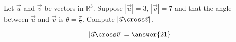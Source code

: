\documentclass{ximera}
\author{Gregory Hartman \and Matthew Carr}
\begin{document}
\begin{exercise}



Let $\vec{u}$ and $\vec{v}$ be vectors in $\mathbb{R}^3$. Suppose $|\vec{u}|=3$, $|\vec{v}|=7$ and that the angle between $\vec{u}$ and $\vec{v}$ is $\theta=\frac{\pi}{2}$. Compute $|\vec{u}\cross\vec{v}|$.

\begin{prompt}
\[
|\vec{u}\cross\vec{v}|=\answer{21}
\]
\end{prompt}


\end{exercise}
\end{document}

